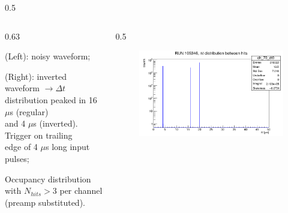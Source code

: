 \documentclass{beamer}
\begin{document}
\begin{frame}
\begin{columns}
\begin{column}{0.5\framewidth}
\begin{figure}[!h]
     \label{fig:normalhits}
\end{figure}
\end{column}
\end{columns}
    \begin{columns}
    \begin{column}{0.63\framewidth}
        \setlength{\leftmargini}{1.1em}
      \begin{itemize}
 {\footnotesize
 \item (Left): noisy waveform;
\item (Right): inverted waveform $\rightarrow \Delta t $ distribution peaked in 16 $\mu$s (regular) \\ and 4 $\mu$s (inverted). Trigger on trailing \\ edge of 4 $\mu$s long input pulses;
\item Occupancy distribution with $N_{hits}> 3$ per channel (preamp substituted).}

\end{itemize}
\end{column}
\begin{column}{0.5\framewidth}
         \begin{figure}[!h]
      \centering
      \hspace*{-2em}
      \includegraphics[width=\columnwidth]{figures/png/deltathits.png}
     \label{fig:normalhits}
\end{figure}
\end{column}
\end{columns}
\end{frame}
\end{document}
